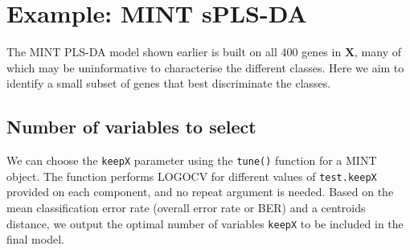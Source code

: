 \documentclass[
]{book}
\newenvironment{Shaded}{\begin{snugshade}}{\end{snugshade}}
\newcommand{\AttributeTok}[1]{\textcolor[rgb]{0.77,0.63,0.00}{#1}}
\newcommand{\CommentTok}[1]{\textcolor[rgb]{0.56,0.35,0.01}{\textit{#1}}}
\newcommand{\DecValTok}[1]{\textcolor[rgb]{0.00,0.00,0.81}{#1}}
\newcommand{\FunctionTok}[1]{\textcolor[rgb]{0.00,0.00,0.00}{#1}}
\newcommand{\NormalTok}[1]{#1}
\newcommand{\OtherTok}[1]{\textcolor[rgb]{0.56,0.35,0.01}{#1}}
\newcommand{\StringTok}[1]{\textcolor[rgb]{0.31,0.60,0.02}{#1}}
\begin{document}
\hypertarget{mint:splsda}{%
\section{Example: MINT sPLS-DA}\label{mint:splsda}}

The MINT PLS-DA model shown earlier is built on all 400 genes in \(\boldsymbol X\), many of which may be uninformative to characterise the different classes. Here we aim to identify a small subset of genes that best discriminate the classes.

\hypertarget{number-of-variables-to-select}{%
\subsection{Number of variables to select}\label{number-of-variables-to-select}}

We can choose the \texttt{keepX} parameter using the \texttt{tune()} function for a MINT object. The function performs LOGOCV for different values of \texttt{test.keepX} provided on each component, and no repeat argument is needed. Based on the mean classification error rate (overall error rate or BER) and a centroids distance, we output the optimal number of variables \texttt{keepX} to be included in the final model.

\begin{Shaded}
\end{Shaded}
\end{document}
